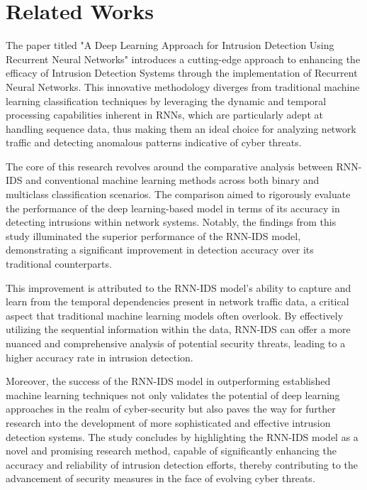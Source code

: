 \section{Related Works}
\vspace{-18pt}
The paper titled "A Deep Learning Approach for Intrusion Detection Using Recurrent Neural Networks" introduces a cutting-edge approach to enhancing the efficacy of Intrusion Detection Systems through the implementation of Recurrent Neural Networks. This innovative methodology diverges from traditional machine learning classification techniques by leveraging the dynamic and temporal processing capabilities inherent in RNNs, which are particularly adept at handling sequence data, thus making them an ideal choice for analyzing network traffic and detecting anomalous patterns indicative of cyber threats.\par
The core of this research revolves around the comparative analysis between RNN-IDS and conventional machine learning methods across both binary and multiclass classification scenarios. The comparison aimed to rigorously evaluate the performance of the deep learning-based model in terms of its accuracy in detecting intrusions within network systems. Notably, the findings from this study illuminated the superior performance of the RNN-IDS model, demonstrating a significant improvement in detection accuracy over its traditional counterparts.\par 
This improvement is attributed to the RNN-IDS model's ability to capture and learn from the temporal dependencies present in network traffic data, a critical aspect that traditional machine learning models often overlook. By effectively utilizing the sequential information within the data, RNN-IDS can offer a more nuanced and comprehensive analysis of potential security threats, leading to a higher accuracy rate in intrusion detection.\par 
Moreover, the success of the RNN-IDS model in outperforming established machine learning techniques not only validates the potential of deep learning approaches in the realm of cyber-security but also paves the way for further research into the development of more sophisticated and effective intrusion detection systems. The study concludes by highlighting the RNN-IDS model as a novel and promising research method, capable of significantly enhancing the accuracy and reliability of intrusion detection efforts, thereby contributing to the advancement of security measures in the face of evolving cyber threats\cite{yin2017deep}.
\par 
